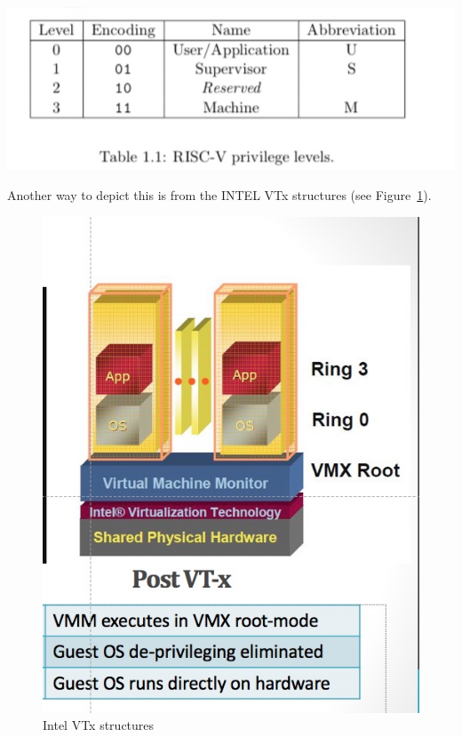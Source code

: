 \documentclass{article}
\begin{document}
\begin{center}
\includegraphics[scale = .4]
{figures/figure2_privleged_level_simple.jpg}   \centering
 \end{center}


Another way to depict this is  from the INTEL  VTx structures (see Figure~\ref{fig:intelvtx}).

\begin{figure}[h]
\includegraphics[scale=.4]{figures/figure2a_intelvtx.jpg}
\caption{Intel VTx structures\label{fig:intelvtx}}
\end{figure}
\end{document}
